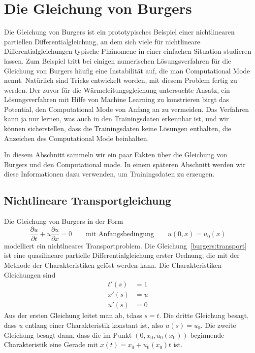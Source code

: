 %
%
%
\section{Die Gleichung von Burgers}
Die Gleichung von Burgers ist ein prototypisches Beispiel einer nichtlinearen
partiellen Differentialgleichung, an dem sich viele für nichtlineare
Differentialgleichungen typische Phänomene in einer einfachen Situation
studieren lassen.
Zum Beispiel tritt bei einigen numerischen Lösungsverfahren für die
Gleichung von Burgers häufig eine Instabilität auf, die man 
Computational Mode nennt.
Natürlich sind Tricks entwickelt worden, mit diesem Problem fertig
zu werden.
Der zuvor für die Wärmeleitungsgleichung untersuchte Ansatz, ein
Lösungsverfahren mit Hilfe von Machine Learning zu konstrieren birgt
das Potential, den Computational Mode von Anfang an zu vermeiden.
Das Verfahren kann ja nur lernen, was auch in den Trainingsdaten
erkennbar ist, und wir können sicherstellen, dass die Trainingsdaten
keine Lösungen enthalten, die Anzeichen des Computational Mode beinhalten.

In diesem Abschnitt sammeln wir ein paar Fakten über die Gleichung 
von Burgers und den Computational mode.
In einem späteren Abschnitt werden wir diese Informationen dazu
verwenden, um Trainingsdaten zu erzeugen.

\subsection{Nichtlineare Transportgleichung\label{subsection:nichtlineare}}
Die Gleichung von Burgers in der Form
\begin{equation}
\frac{\partial u}{\partial t} + u\frac{\partial u}{\partial x}=0
\qquad\text{mit Anfangsbedingung}\qquad
u(0,x) = u_0(x)
\label{burgers:transport}
\end{equation}
modelliert ein nichtlneares Transportproblem.
Die Gleichung~\eqref{burgers:transport} ist eine quasilineare partielle
Differentialgleichung erster Ordnung, die mit der Methode der
Charakteristiken \cite{burgers:pde} gelöst werden kann.
Die Charakteristiken-Gleichungen sind
\begin{align*}
t'(s)&=1
\\ 
x'(s)&=u
\\
u'(s)&=0
\end{align*}
Aus der ersten Gleichung leitet man ab, tdass $s=t$.
Die dritte Gleichung besagt, dass $u$ entlang einer Charakteristik konstant
ist, also $u(s)=u_0$.
Die zweite Gleichung besagt dann, dass die im Punkt $(0,x_0,u_0(x_0))$
beginnende Charakteristik eine Gerade mit $x(t)=x_0 + u_0(x_0)t$ ist.

